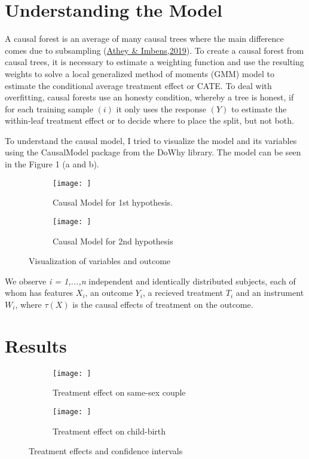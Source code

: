 \documentclass[11pt, a4paper, leqno]{article}
\begin{document}
 \section{Understanding the Model} %
\label{sec:Understanding the Model}

A causal forest is an average of many causal trees where the main difference comes due to subsampling
(\href{https://www.annualreviews.org/doi/abs/10.1146/annurev-economics-080217-053433}{Athey \& Imbens,2019}). To create a causal forest from 
causal trees, it is necessary to estimate a weighting function and use the resulting weights to solve a local generalized method of moments (GMM) 
model to estimate the conditional average treatment effect or CATE. To deal with overfitting, causal forests use an honesty condition, whereby a 
tree is honest, if for each training sample $(i)$ it only uses the response $(Y)$ to estimate the within-leaf treatment effect or to decide where 
to place the split, but not both. 

To understand the causal model, I tried to visualize the model and its variables using the CausalModel package from the DoWhy library. The model 
can be seen in the Figure 1 (a and b). 

\begin{figure}[!tbp]
  \begin{subfigure}[b]{0.4\textwidth}
    \texttt{[image: ]}
    \caption{Causal Model for 1st hypothesis.}
    \label{fig:f1}
  \end{subfigure}
  \hfill
  \begin{subfigure}[b]{0.4\textwidth}
    \texttt{[image: ]}
    \caption{Causal Model for 2nd hypothesis}
    \label{fig:f2}
  \end{subfigure}
  \caption{Visualization of variables and outcome}
\end{figure}

We observe \textit{i = 1,...,n} independent and identically distributed subjects, each of whom has features $X_i$, an outcome $Y_i$, a recieved 
treatment $T_i$ and an instrument $W_i$, where $\tau(X)$ is the causal effects of treatment on the outcome.


 \section{Results} %
\label{sec:Results}

\begin{figure}[!tbp]
  \begin{subfigure}[c]{0.4\textwidth}
    \texttt{[image: ]}
    \caption{Treatment effect on same-sex couple}
    \label{fig:f3}
  \end{subfigure}
  \hfill
  \begin{subfigure}[c]{0.4\textwidth}
    \texttt{[image: ]}
    \caption{Treatment effect on child-birth}
    \label{fig:f4}
  \end{subfigure}
  \caption{Treatment effects and confidence intervals}
\end{figure}
\end{document}
